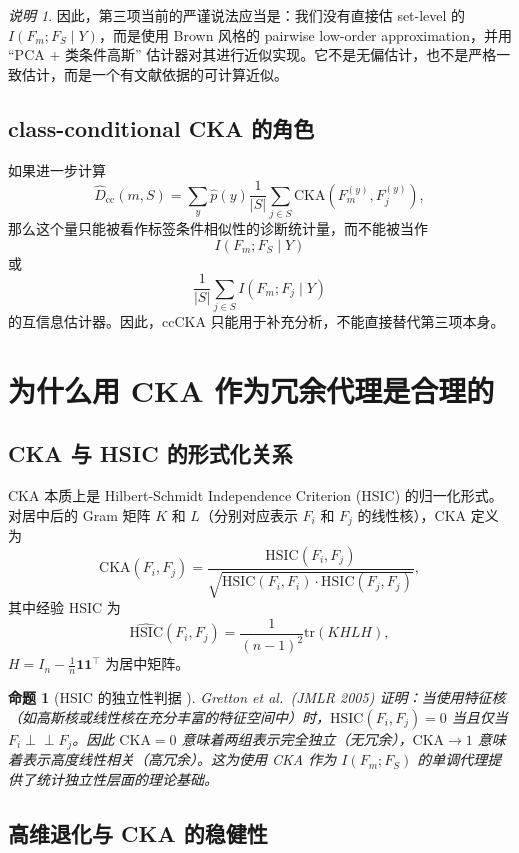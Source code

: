 \documentclass[UTF8,fontset=fandol]{ctexart}
\newtheorem{proposition}{命题}
\theoremstyle{remark}
\newtheorem{remark}{说明}
\begin{document}
\begin{remark}
因此，第三项当前的严谨说法应当是：我们没有直接估 set-level 的 $I(F_m; F_S \mid Y)$，而是使用 Brown 风格的 pairwise low-order approximation，并用 ``PCA + 类条件高斯'' 估计器对其进行近似实现。它不是无偏估计，也不是严格一致估计，而是一个有文献依据的可计算近似。
\end{remark}

\subsection{class-conditional CKA 的角色}

如果进一步计算
\[
\widehat D_{\mathrm{cc}}(m, S)
= \sum_y \hat p(y)\frac{1}{|S|}\sum_{j \in S}\mathrm{CKA}(F_m^{(y)}, F_j^{(y)}),
\]
那么这个量只能被看作标签条件相似性的诊断统计量，而不能被当作
\[
I(F_m; F_S \mid Y)
\]
或
\[
\frac{1}{|S|}\sum_{j \in S} I(F_m; F_j \mid Y)
\]
的互信息估计器。因此，ccCKA 只能用于补充分析，不能直接替代第三项本身。

\section{为什么用 CKA 作为冗余代理是合理的}

\subsection{CKA 与 HSIC 的形式化关系}

CKA 本质上是 Hilbert-Schmidt Independence Criterion (HSIC) 的归一化形式。对居中后的 Gram 矩阵 $K$ 和 $L$（分别对应表示 $F_i$ 和 $F_j$ 的线性核），CKA 定义为
\[
\mathrm{CKA}(F_i, F_j) = \frac{\mathrm{HSIC}(F_i, F_j)}{\sqrt{\mathrm{HSIC}(F_i, F_i) \cdot \mathrm{HSIC}(F_j, F_j)}},
\]
其中经验 HSIC 为
\[
\widehat{\mathrm{HSIC}}(F_i, F_j) = \frac{1}{(n-1)^2} \mathrm{tr}(KHLH),
\]
$H = I_n - \frac{1}{n}\mathbf{1}\mathbf{1}^\top$ 为居中矩阵。

\begin{proposition}[HSIC 的独立性判据 \cite{gretton2005measuring}]
\label{prop:hsic}
Gretton et al.\ (JMLR 2005) 证明：当使用特征核（如高斯核或线性核在充分丰富的特征空间中）时，$\mathrm{HSIC}(F_i, F_j) = 0$ 当且仅当 $F_i \perp\!\!\!\perp F_j$。因此 $\mathrm{CKA} = 0$ 意味着两组表示完全独立（无冗余），$\mathrm{CKA} \to 1$ 意味着表示高度线性相关（高冗余）。这为使用 CKA 作为 $I(F_m; F_S)$ 的单调代理提供了统计独立性层面的理论基础。
\end{proposition}

\subsection{高维退化与 CKA 的稳健性}
\end{document}
